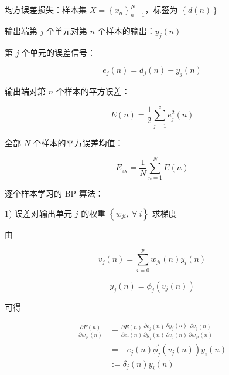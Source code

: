 \documentclass[openany,a4paper,12pt]{ctexbook}
\theoremstyle{kaiti}
\theoremstyle{normal}
\begin{document}
均方误差损失：样本集 $X=\left\{ x_n \right\}_{n=1}^{N}$，标签为 $\left\{ d\left(n \right)\right\}$

输出端第 $j$ 个单元对第 $n$ 个样本的输出：$y_j\left(n \right)$

第 $j$ 个单元的误差信号：

\begin{equation}
e_j\left(n \right)=d_j\left(n \right)-y_j\left(n \right)
\end{equation}

输出端对第 $n$ 个样本的平方误差：

\begin{equation}
E\left(n \right)=\frac{1}{2}\sum_{j=1}^{c}e_{j}^{2}\left(n \right)
\end{equation}

全部 $N$ 个样本的平方误差均值：

\begin{equation}
E_{\mathrm{av}}=\frac{1}{N}\sum_{n=1}^{N}E\left(n \right)
\end{equation}

逐个样本学习的 BP 算法：

1) 误差对输出单元 $j$ 的权重 $\left\{ w_{ji},~\forall~i \right\}$ 求梯度

由

\begin{equation}
v_j\left(n \right)=\sum_{i=0}^{p}w_{ji}\left(n \right)y_i\left(n \right)
\end{equation}

\begin{equation}
y_j\left(n \right)=\phi_j\left(v_j\left(n \right)\right)
\end{equation}

可得

\begin{equation}
\begin{aligned}
  \frac{\partial E\left(n \right)}{\partial w_{ji}\left(n \right)}
  &=\frac{\partial E\left(n \right)}{\partial e_j\left(n \right)}\frac{\partial e_j\left(n \right)}{\partial y_j\left(n \right)}\frac{\partial y_j\left(n \right)}{\partial v_j\left(n \right)}\frac{\partial v_j\left(n \right)}{\partial w_{ji}\left(n \right)}\\
  &=-e_j\left(n \right)\phi_{j}^{'}\left(v_j\left(n \right)\right)y_i\left(n \right)\\
  &:=\delta_j\left(n \right)y_i\left(n \right)
\end{aligned}
\end{equation}
\end{document}
